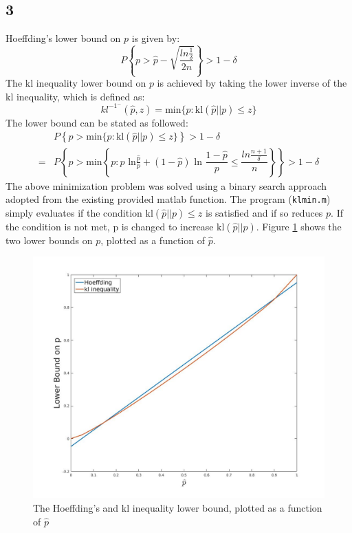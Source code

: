 \documentclass{article}
\begin{document}
\subsection{3}
Hoeffding’s lower bound on $p$ is given by:
\begin{equation*}
P \left\lbrace p > \hat{p} - \sqrt{ \dfrac{ln \frac{1}{\delta}}{2n}} \right\rbrace > 1-\delta
\end{equation*}
The kl inequality lower bound on $p$ is achieved by taking the lower inverse of the kl inequality, which is defined as:
\begin{equation}
kl^{-1^-}(\hat{p},z) = \text{min} \lbrace p: \text{kl}(\hat{p} || p) \leq z \rbrace
\end{equation}
The lower bound can be stated as followed:
\begin{align*}
&P \left\lbrace p > \text{min} \lbrace p: \text{kl}(\hat{p} || p) \leq z \rbrace \right \rbrace > 1-\delta  \\
=&P \left\lbrace p > \text{min} \left\lbrace p : p \text{ ln} \frac{\hat{p}}{p} + (1-\hat{p}) \text{ ln } \dfrac{1-\hat{p}}{p} \leq \dfrac{ln \frac{n+1}{\delta}}{n} \right \rbrace \right\rbrace > 1- \delta
\end{align*}
The above minimization problem was solved using a binary search approach adopted from the existing provided matlab function. The program (\texttt{klmin.m}) simply evaluates if the condition $\text{kl}(\hat{p}||p) \leq z$ is satisfied and if so reduces $p$. If the condition is not met, p is changed to increase $\text{kl}(\hat{p}||p)$. Figure \ref{fig:2} shows the two lower bounds on $p$, plotted as a function of $\hat{p}$.
\begin{figure}[H]
  \centering
  \includegraphics[width=17cm]{fig/3.jpg}
  \caption{\footnotesize The Hoeffding’s and kl inequality lower bound, plotted as a function of $\hat{p}$}
    \label{fig:2}
\end{figure}
\end{document}
